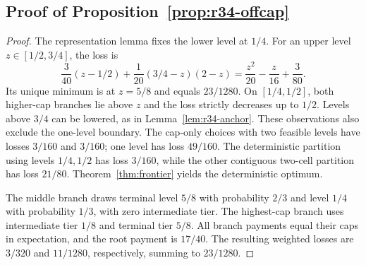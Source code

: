 \subsection{Proof of Proposition~\ref{prop:r34-offcap}}\label{ec-proof-prop-r34-offcap}
\begin{proof}
The representation lemma fixes the lower level at $1/4$. For an upper level $z\in[1/2,3/4]$, the loss is
\[
 \frac{3}{40}(z-1/2)+\frac1{20}(3/4-z)(2-z)
 =\frac{z^2}{20}-\frac{z}{16}+\frac{3}{80}.
\]
Its unique minimum is at $z=5/8$ and equals $23/1280$. On $[1/4,1/2]$, both higher-cap branches lie above $z$ and the loss strictly decreases up to $1/2$. Levels above $3/4$ can be lowered, as in Lemma~\ref{lem:r34-anchor}. These observations also exclude the one-level boundary. The cap-only choices with two feasible levels have losses $3/160$ and $3/160$; one level has loss $49/160$. The deterministic partition using levels $1/4,1/2$ has loss $3/160$, while the other contiguous two-cell partition has loss $21/80$. Theorem~\ref{thm:frontier} yields the deterministic optimum.

The middle branch draws terminal level $5/8$ with probability $2/3$ and level $1/4$ with probability $1/3$, with zero intermediate tier. The highest-cap branch uses intermediate tier $1/8$ and terminal tier $5/8$. All branch payments equal their caps in expectation, and the root payment is $17/40$. The resulting weighted losses are $3/320$ and $11/1280$, respectively, summing to $23/1280$.\end{proof}
